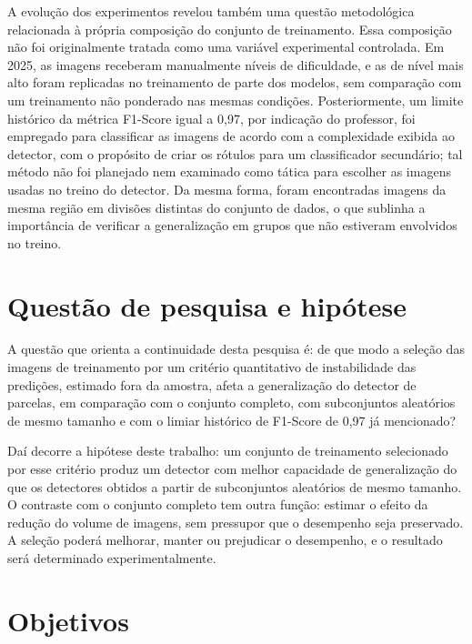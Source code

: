 A evolu\c{c}\~ao dos experimentos revelou tamb\'em uma quest\~ao metodol\'ogica relacionada \`a pr\'opria composi\c{c}\~ao do conjunto de treinamento. Essa composi\c{c}\~ao n\~ao foi originalmente tratada como uma vari\'avel experimental controlada. Em 2025, as imagens receberam manualmente n\'iveis de dificuldade, e as de n\'ivel mais alto foram replicadas no treinamento de parte dos modelos, sem compara\c{c}\~ao com um treinamento n\~ao ponderado nas mesmas condi\c{c}\~oes. Posteriormente, um limite hist\'orico da m\'etrica F1-Score igual a 0,97, por indica\c{c}\~ao do professor, foi empregado para classificar as imagens de acordo com a complexidade exibida ao detector, com o prop\'osito de criar os r\'otulos para um classificador secund\'ario; tal m\'etodo n\~ao foi planejado nem examinado como t\'atica para escolher as imagens usadas no treino do detector. Da mesma forma, foram encontradas imagens da mesma regi\~ao em divis\~oes distintas do conjunto de dados, o que sublinha a import\^ancia de verificar a generaliza\c{c}\~ao em grupos que n\~ao estiveram envolvidos no treino.

\section{Quest\~ao de pesquisa e hip\'otese}
\label{sec:questao-hipotese}

A quest\~ao que orienta a continuidade desta pesquisa \'e: de que modo a sele\c{c}\~ao das imagens de treinamento por um crit\'erio quantitativo de instabilidade das predi\c{c}\~oes, estimado fora da amostra, afeta a generaliza\c{c}\~ao do detector de parcelas, em compara\c{c}\~ao com o conjunto completo, com subconjuntos aleat\'orios de mesmo tamanho e com o limiar hist\'orico de F1-Score de 0,97 j\'a mencionado?

Da\'i decorre a hip\'otese deste trabalho: um conjunto de treinamento selecionado por esse crit\'erio produz um detector com melhor capacidade de generaliza\c{c}\~ao do que os detectores obtidos a partir de subconjuntos aleat\'orios de mesmo tamanho. O contraste com o conjunto completo tem outra fun\c{c}\~ao: estimar o efeito da redu\c{c}\~ao do volume de imagens, sem pressupor que o desempenho seja preservado. A sele\c{c}\~ao poder\'a melhorar, manter ou prejudicar o desempenho, e o resultado ser\'a determinado experimentalmente.

\section{Objetivos}
\label{sec:objetivos}


